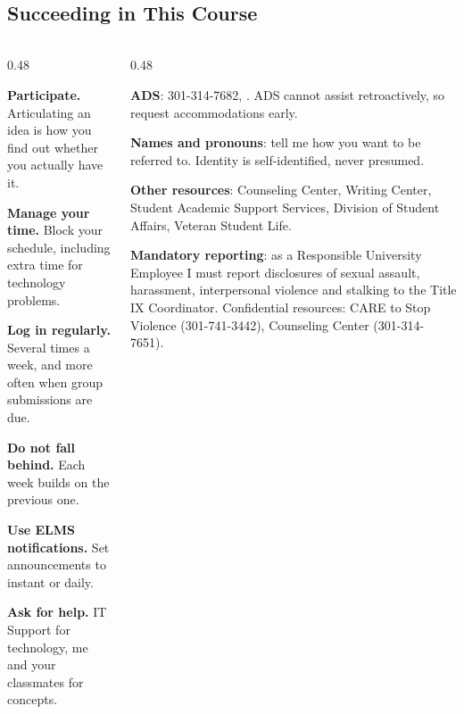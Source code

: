 \documentclass[
    10pt,
    dvipsnames,
    svgnames,
    x11names,
    aspectratio=1610,
    english,
    codeminted]{beamer}
\begin{document}
\subsection*{Succeeding in This Course}
\begingroup
\divframetrue
\renewcommand{\divbartextA}{\secname}
\renewcommand{\divbartextB}{}
\begin{frame}{\secname}
  \divbar{\secname}{\subsecname}
  
  \framesubtitle{\subsecname}
  
\begin{columns}[T,onlytextwidth]
\begin{column}{0.48\textwidth}
\begin{compactitem}
\footnotesize
    \item \textbf{Participate.} Articulating an idea is how you find out whether you actually have it.
    \item \textbf{Manage your time.} Block your schedule, including extra time for technology problems.
    \item \textbf{Log in regularly.} Several times a week, and more often when group submissions are due.
    \item \textbf{Do not fall behind.} Each week builds on the previous one.
    \item \textbf{Use ELMS notifications.} Set announcements to instant or daily.
    \item \textbf{Ask for help.} IT Support for technology, me and your classmates for concepts.
\end{compactitem}
\end{column}
\begin{column}{0.48\textwidth}
\begin{compactitem}
\footnotesize
    \item \textbf{ADS}: 301-314-7682, . ADS cannot assist retroactively, so request accommodations early.
    \item \textbf{Names and pronouns}: tell me how you want to be referred to. Identity is self-identified, never presumed.
    \item \textbf{Other resources}: Counseling Center, Writing Center, Student Academic Support Services, Division of Student Affairs, Veteran Student Life.
    \item \textbf{Mandatory reporting}: as a Responsible University Employee I must report disclosures of sexual assault, harassment, interpersonal violence and stalking to the Title IX Coordinator. Confidential resources: CARE to Stop Violence (301-741-3442), Counseling Center (301-314-7651).
\end{compactitem}
\end{column}
\end{columns}


\end{frame}
\end{document}
